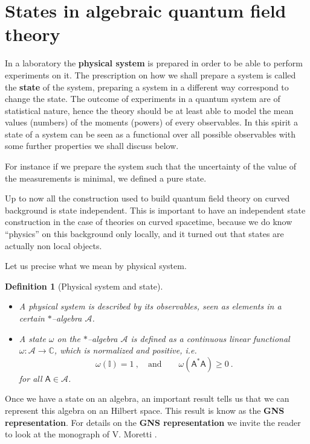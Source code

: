 \documentclass[11pt]{book}
\newcommand{\Acal}{\mathcal{A}}
\newcommand{\Cbb}{\mathbb{C}}
\newcommand{\Ibb}{\mathbb{I}}
\newcommand{\Asf}{\mathsf{A}}
\theoremstyle{break}
\newtheorem{definition}{Definition}[chapter]
\begin{document}


\section{States in algebraic quantum field theory}
\label{p:STATES}


In a laboratory the \textbf{physical system} is prepared in order to be able to perform experiments on it. The prescription on how we shall prepare a system is called the \textbf{state} of the system, preparing a system in a different way correspond to change the state. The outcome of experiments in a quantum system are of statistical nature, hence the theory should be at least able to model the mean values (numbers) of the moments (powers) of every observables. In this spirit a state of a system can be seen as a functional over all possible observables with some further properties we shall discuss below.


For instance if we prepare the system such that the uncertainty of the value of the measurements is minimal, we defined a pure state. 


Up to now all the construction used to build quantum field theory on curved background is state independent. This is important to have an independent state construction in the case of theories on curved spacetime, because we do know ``physics''  on this background only locally, and it turned out that states are actually non local objects.


Let us precise what we mean by physical system.


\begin{definition}[Physical system and state] 
\begin{itemize}
\item A physical system is described by its observables, seen as elements in a certain $\ast$--algebra $\Acal$.
%
\item A state $\omega$ on the $\ast$--algebra $\Acal$ is defined as a continuous linear functional $\omega : \Acal \to \Cbb$, which is normalized and positive, i.e.
%
\begin{equation*}
\omega(\Ibb) =  1 \ , \quad \mbox{and} \qquad \omega(\Asf^\ast \Asf) \geq 0 \ . 
\end{equation*}
%
for all $\Asf \in \Acal$.
\end{itemize}
\end{definition}


Once we have a state on an algebra, an important result tells us that we can represent this algebra on an Hilbert space. This result is know as the \textbf{GNS representation}. For details on the \textbf{GNS representation} we invite the reader to look at the monograph of V. Moretti \cite{moretti_spectral_2013}.
\end{document}
